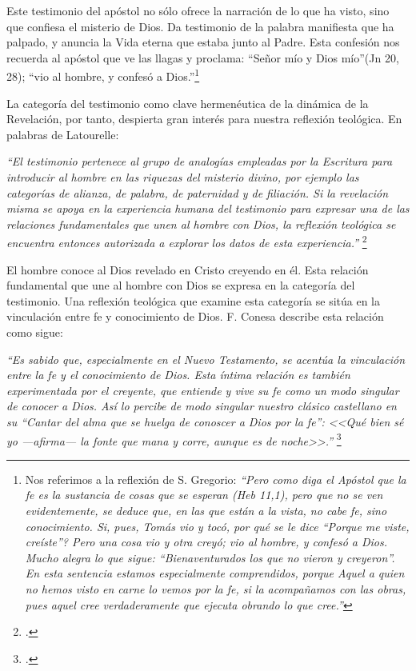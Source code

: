 \documentclass[../main.tex]{subfiles}
\begin{document}
Este testimonio del apóstol no sólo ofrece la narración de lo que ha visto, sino que confiesa el misterio de Dios. Da testimonio de la palabra manifiesta que ha palpado, y anuncia la Vida eterna que estaba junto al Padre. Esta confesión nos recuerda al apóstol que ve las llagas y proclama: ``Señor mío y Dios mío''(Jn 20, 28); ``vio al hombre, y confesó a Dios.''\footnote{Nos referimos a la reflexión de S. Gregorio: \emph{``Pero como diga el Apóstol que la fe es la sustancia de cosas que se esperan (Heb 11,1), pero que no se ven evidentemente, se deduce que, en las que están a la vista, no cabe fe, sino conocimiento. Si, pues, Tomás vio y tocó, \textquestiondown{}por qué se le dice ``Porque me viste, creíste''? Pero una cosa vio y otra creyó; vio al hombre, y confesó a Dios. Mucho alegra lo que sigue: ``Bienaventurados los que no vieron y creyeron''. En esta sentencia estamos especialmente comprendidos, porque Aquel a quien no hemos visto en carne lo vemos por la fe, si la acompañamos con las obras, pues aquel cree verdaderamente que ejecuta obrando lo que cree.''}\cite[Homilía 26]{greg}
}

La categoría del testimonio como clave hermenéutica de la dinámica de la Revelación, por tanto, despierta gran interés para nuestra reflexión teológica. En palabras de Latourelle:

\emph{
``El testimonio pertenece al grupo de analogías empleadas por la Escritura para introducir al hombre en las riquezas del misterio divino, por ejemplo las categorías de alianza, de palabra, de paternidad y de filiación. Si la revelación misma se apoya en la experiencia humana del testimonio para expresar una de las relaciones fundamentales que unen al hombre con Dios, la reflexión teológica se encuentra entonces autorizada a explorar los datos de esta experiencia.''
}\footcite[1523]{dicctf}

El hombre conoce al Dios revelado en Cristo creyendo en él. Esta relación fundamental que une al hombre con Dios se expresa en la categoría del testimonio. Una reflexión teológica que examine esta categoría se sitúa en la vinculación entre fe y conocimiento de Dios. F. Conesa describe esta relación como sigue:

\emph{
``Es sabido que, especialmente en el Nuevo Testamento, se acentúa la vinculación entre la fe y el conocimiento de Dios. Esta íntima relación es también experimentada por el creyente, que entiende y vive su fe como un modo singular de conocer a Dios. Así lo percibe de modo singular nuestro clásico castellano en su ``Cantar del alma que se huelga de conoscer a Dios por la fe'': <<Qué bien sé yo ---afirma--- la fonte que mana y corre, aunque es de noche>>.''
}\footcite[15]{cyc}
\end{document}
